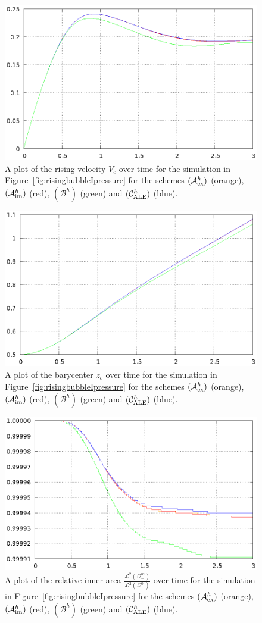 \documentclass[a4paper,12pt,onecolumn]{article}
\newcommand{\schemeAex}{{\mathcal{A}^h_{\rm ex}}}
\newcommand{\schemeAim}{{\mathcal{A}^h_{\rm im}}}
\newcommand{\schemeB}{{\mathcal{B}^h}}
\newcommand{\schemeALE}{{\mathcal{C}^h_{\rm ALE}}}
\begin{document}
\begin{figure}[htbp]
\centering
\includegraphics[width=.45\textwidth]
{figures/rising_bubble_I_rising_velocity.ps}
\caption{A plot of the rising velocity $V_c$ over time for the simulation in
Figure~\ref{fig:risingbubbleIpressure} for the schemes
$(\schemeAex)$ (orange), $(\schemeAim)$ (red), $(\schemeB)$ (green) and
$(\schemeALE)$ (blue).}
\label{fig:risingbubbleIrisingvelocity}
\end{figure}%
\begin{figure}[htbp]
\centering
\includegraphics[width=.45\textwidth]
{figures/rising_bubble_I_barycenter.ps}
\caption{A plot of the barycenter $z_c$ over time for the simulation in
Figure~\ref{fig:risingbubbleIpressure} for the schemes
$(\schemeAex)$ (orange), $(\schemeAim)$ (red), $(\schemeB)$ (green) and
$(\schemeALE)$ (blue).}
\label{fig:risingbubbleIbarycenter}
\end{figure}%
\begin{figure}[htbp]
\centering
\includegraphics[width=.45\textwidth]
{figures/rising_bubble_I_inner_volume.ps}
\caption{A plot of the relative inner area
$\frac{\mathcal{L}^2(\Omega^m_-)}{\mathcal{L}^2(\Omega^0_-)}$ over time for the
simulation in Figure~\ref{fig:risingbubbleIpressure} for the schemes
$(\schemeAex)$ (orange), $(\schemeAim)$ (red), $(\schemeB)$ (green) and
$(\schemeALE)$ (blue).}
\label{fig:risingbubbleIinnervolume}
\end{figure}%
\end{document}

